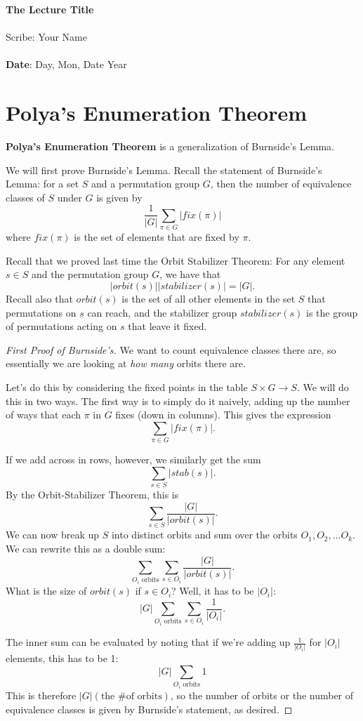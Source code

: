 \documentclass[11pt,twosided]{article}
\def\titlestring{The Lecture Title}
\def\scribestring{Your Name}
\def\datestring{Day, Mon, Date Year}
\begin{document}
\thispagestyle{plain}  %

\noindent
{\LARGE \textbf{\titlestring}}\\\\
%
{\Large Scribe: \scribestring}\\ \\
{\textbf{Date}: \datestring}


\noindent

\section{Polya's Enumeration Theorem}
\textbf{Polya's Enumeration Theorem} is a generalization of Burnside's Lemma. 

We will first prove Burnside's Lemma. Recall the statement of Burnside's Lemma: for a set $S$ and a permutation group $G$, then the number of equivalence classes of $S$ under $G$ is given by 
\[
	\frac{1}{|G|} \sum_{\pi \in G} |fix(\pi)| 
\]
where $fix(\pi)$ is the set of elements that are fixed by $\pi$. 

Recall that we proved last time the Orbit Stabilizer Theorem: 
For any element $s \in S$ and the permutation group $G$, we have that 
\[
	|orbit(s)||stabilizer(s)| = |G|.
\]
Recall also that $orbit(s)$ is the set of all other elements in the set $S$ that permutations on $s$ can reach, and the stabilizer group $stabilizer(s)$ is the group of permutations acting on $s$ that leave it fixed. 


\begin{proof}[First Proof of Burnside's]
We want to count equivalence classes there are, so essentially we are looking at \textit{how many} orbits there are. 

Let's do this by considering the fixed points in the table $S \times G \rightarrow S$. We will do this in two ways. The first way is to simply do it naively, adding up the number of ways that each $\pi$ in $G$ fixes (down in columns). This gives the expression 
\[
	\sum_{\pi \in G} |fix(\pi)|.
\]

If we add across in rows, however, we similarly get the sum 
\[
	\sum_{s \in S} |stab(s)|.
\]
By the Orbit-Stabilizer Theorem, this is 
\[
	\sum_{s \in S} \frac{|G|}{|orbit(s)|}.
\]
We can now break up $S$ into distinct orbits and sum over the orbits $O_1, O_2, \ldots O_k$. We can rewrite this as a double sum: 
\[
	\sum_{O_i \text{ orbits}}\sum_{s \in O_i} \frac{|G|}{|orbit(s)|}.
\]
What is the size of $orbit(s)$ if $s \in O_i$? Well, it has to be $|O_i|$: 
\[
	|G| \sum_{O_i \text{ orbits}}\sum_{s \in O_i} \frac{1}{|O_i|}.
\]

The inner sum can be evaluated by noting that if we're adding up $\frac{1}{|O_i|}$ for $|O_i|$ elements, this has to be 1: 
\[
	|G| \sum_{O_i \text{ orbits}} 1
\]
This is therefore $|G| (\text{the \# of orbits})$, so the number of orbits or the number of equivalence classes is given by Burnside's statement, as desired. 

\end{proof}
\end{document}
